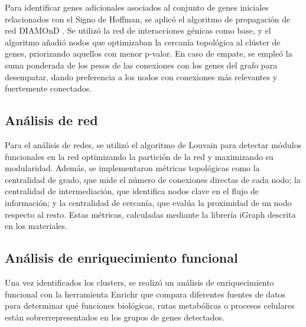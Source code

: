 Para identificar genes adicionales asociados al conjunto de genes iniciales relacionados con el Signo de Hoffman, se aplicó el algoritmo de propagación de red DIAMOnD \cite{Ghiassian2015}. Se utilizó la red de interacciones génicas como base, y el algoritmo añadió nodos que optimizaban la cercanía topológica al clúster de genes, priorizando aquellos con menor p-valor. En caso de empate, se empleó la suma ponderada de los pesos de las conexiones con los genes del grafo para desempatar, dando preferencia a los nodos con conexiones más relevantes y fuertemente conectados.


\subsection{Análisis de red}

Para el análisis de redes, se utilizó el algoritmo de Louvain \cite{Blondel2008} para detectar módulos funcionales en la red optimizando la partición de la red y maximizando su modularidad. Además, se implementaron métricas topológicas como la centralidad de grado, que mide el número de conexiones directas de cada nodo; la centralidad de intermediación, que identifica nodos clave en el flujo de información; y la centralidad de cercanía, que evalúa la proximidad de un nodo respecto al resto. Estas métricas, calculadas mediante la librería iGraph descrita en los materiales.

\subsection{Análisis de enriquecimiento funcional}

Una vez identificados los clusters, se realizó un análisis de enriquecimiento funcional con la herramienta Enrichr \cite{10.1093/nar/gkad393/1} que compara diferentes fuentes de datos para determinar qué funciones biológicas, rutas metabólicas o procesos celulares están sobrerrepresentados en los grupos de genes detectados.
